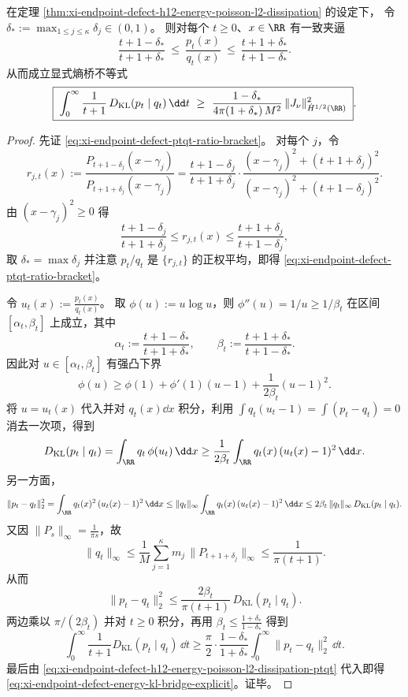 \begin{theorem}\label{thm:xi-endpoint-defect-energy-kl-bridge-explicit}
在定理 \ref{thm:xi-endpoint-defect-h12-energy-poisson-l2-dissipation} 的设定下，
令 \(\delta_\ast:=\max_{1\le j\le\kappa}\delta_j\in(0,1)\)。
则对每个 \(t\ge0\)、\(x\in\RR\) 有一致夹逼
\begin{equation}\label{eq:xi-endpoint-defect-ptqt-ratio-bracket}
\frac{t+1-\delta_\ast}{t+1+\delta_\ast}\ \le\ \frac{p_t(x)}{q_t(x)}\ \le\ \frac{t+1+\delta_\ast}{t+1-\delta_\ast}.
\end{equation}
从而成立显式熵桥不等式
\begin{equation}\label{eq:xi-endpoint-defect-energy-kl-bridge-explicit}
\boxed{\;
\int_0^\infty \frac{1}{t+1}\,D_{\mathrm{KL}}(p_t\mid q_t)\,\dd t
\ \ge\
\frac{1-\delta_\ast}{4\pi(1+\delta_\ast)\,M^2}\,
\|J_\nu\|_{\dot H^{1/2}(\RR)}^2\; }.
\end{equation}
\end{theorem}
\begin{proof}
先证 \eqref{eq:xi-endpoint-defect-ptqt-ratio-bracket}。
对每个 \(j\)，令
\[
r_{j,t}(x):=\frac{P_{t+1-\delta_j}(x-\gamma_j)}{P_{t+1+\delta_j}(x-\gamma_j)}
=\frac{t+1-\delta_j}{t+1+\delta_j}\cdot
\frac{(x-\gamma_j)^2+(t+1+\delta_j)^2}{(x-\gamma_j)^2+(t+1-\delta_j)^2}.
\]
由 \((x-\gamma_j)^2\ge0\) 得
\[
\frac{t+1-\delta_j}{t+1+\delta_j}\le r_{j,t}(x)\le \frac{t+1+\delta_j}{t+1-\delta_j},
\]
取 \(\delta_\ast=\max\delta_j\) 并注意 \(p_t/q_t\) 是 \(\{r_{j,t}\}\) 的正权平均，即得 \eqref{eq:xi-endpoint-defect-ptqt-ratio-bracket}。
\par
令 \(u_t(x):=\frac{p_t(x)}{q_t(x)}\)。
取 \(\phi(u):=u\log u\)，则 \(\phi''(u)=1/u\ge 1/\beta_t\) 在区间 \([\alpha_t,\beta_t]\) 上成立，其中
\[
\alpha_t:=\frac{t+1-\delta_\ast}{t+1+\delta_\ast},\qquad
\beta_t:=\frac{t+1+\delta_\ast}{t+1-\delta_\ast}.
\]
因此对 \(u\in[\alpha_t,\beta_t]\) 有强凸下界
\[
\phi(u)\ge \phi(1)+\phi'(1)(u-1)+\frac{1}{2\beta_t}(u-1)^2.
\]
将 \(u=u_t(x)\) 代入并对 \(q_t(x)\dd x\) 积分，利用 \(\int q_t(u_t-1)=\int(p_t-q_t)=0\) 消去一次项，得到
\[
D_{\mathrm{KL}}(p_t\mid q_t)=\int_{\RR}q_t\,\phi(u_t)\,\dd x
\ge \frac{1}{2\beta_t}\int_{\RR}q_t(x)\,(u_t(x)-1)^2\,\dd x.
\]
另一方面，
\[
\|p_t-q_t\|_2^2=\int_{\RR}q_t(x)^2\,(u_t(x)-1)^2\,\dd x
\le \|q_t\|_{\infty}\int_{\RR}q_t(x)\,(u_t(x)-1)^2\,\dd x
\le 2\beta_t\,\|q_t\|_\infty\,D_{\mathrm{KL}}(p_t\mid q_t).
\]
又因 \(\|P_s\|_\infty=\frac{1}{\pi s}\)，故
\[
\|q_t\|_\infty
\le \frac{1}{M}\sum_{j=1}^{\kappa}m_j\,\|P_{t+1+\delta_j}\|_\infty
\le \frac{1}{\pi(t+1)}.
\]
从而
\[
\|p_t-q_t\|_2^2\le \frac{2\beta_t}{\pi(t+1)}\,D_{\mathrm{KL}}(p_t\mid q_t).
\]
两边乘以 \(\pi/(2\beta_t)\) 并对 \(t\ge0\) 积分，再用
\(
\beta_t\le\frac{1+\delta_\ast}{1-\delta_\ast}
\)
得到
\[
\int_0^\infty \frac{1}{t+1}D_{\mathrm{KL}}(p_t\mid q_t)\,\dd t
\ge \frac{\pi}{2}\cdot\frac{1-\delta_\ast}{1+\delta_\ast}\int_0^\infty \|p_t-q_t\|_2^2\,\dd t.
\]
最后由 \eqref{eq:xi-endpoint-defect-h12-energy-poisson-l2-dissipation-ptqt} 代入即得 \eqref{eq:xi-endpoint-defect-energy-kl-bridge-explicit}。证毕。
\end{proof}

